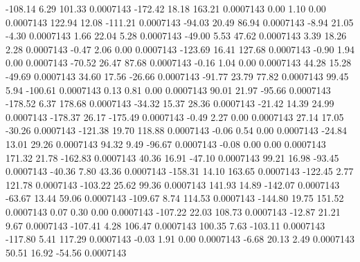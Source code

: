      -108.14        6.29      101.33     0.0007143
     -172.42       18.18      163.21     0.0007143
        0.00        1.10        0.00     0.0007143
      122.94       12.08     -111.21     0.0007143
      -94.03       20.49       86.94     0.0007143
       -8.94       21.05       -4.30     0.0007143
        1.66       22.04        5.28     0.0007143
      -49.00        5.53       47.62     0.0007143
        3.39       18.26        2.28     0.0007143
       -0.47        2.06        0.00     0.0007143
     -123.69       16.41      127.68     0.0007143
       -0.90        1.94        0.00     0.0007143
      -70.52       26.47       87.68     0.0007143
       -0.16        1.04        0.00     0.0007143
       44.28       15.28      -49.69     0.0007143
       34.60       17.56      -26.66     0.0007143
      -91.77       23.79       77.82     0.0007143
       99.45        5.94     -100.61     0.0007143
        0.13        0.81        0.00     0.0007143
       90.01       21.97      -95.66     0.0007143
     -178.52        6.37      178.68     0.0007143
      -34.32       15.37       28.36     0.0007143
      -21.42       14.39       24.99     0.0007143
     -178.37       26.17     -175.49     0.0007143
       -0.49        2.27        0.00     0.0007143
       27.14       17.05      -30.26     0.0007143
     -121.38       19.70      118.88     0.0007143
       -0.06        0.54        0.00     0.0007143
      -24.84       13.01       29.26     0.0007143
       94.32        9.49      -96.67     0.0007143
       -0.08        0.00        0.00     0.0007143
      171.32       21.78     -162.83     0.0007143
       40.36       16.91      -47.10     0.0007143
       99.21       16.98      -93.45     0.0007143
      -40.36        7.80       43.36     0.0007143
     -158.31       14.10      163.65     0.0007143
     -122.45        2.77      121.78     0.0007143
     -103.22       25.62       99.36     0.0007143
      141.93       14.89     -142.07     0.0007143
      -63.67       13.44       59.06     0.0007143
     -109.67        8.74      114.53     0.0007143
     -144.80       19.75      151.52     0.0007143
        0.07        0.30        0.00     0.0007143
     -107.22       22.03      108.73     0.0007143
      -12.87       21.21        9.67     0.0007143
     -107.41        4.28      106.47     0.0007143
      100.35        7.63     -103.11     0.0007143
     -117.80        5.41      117.29     0.0007143
       -0.03        1.91        0.00     0.0007143
       -6.68       20.13        2.49     0.0007143
       50.51       16.92      -54.56     0.0007143
